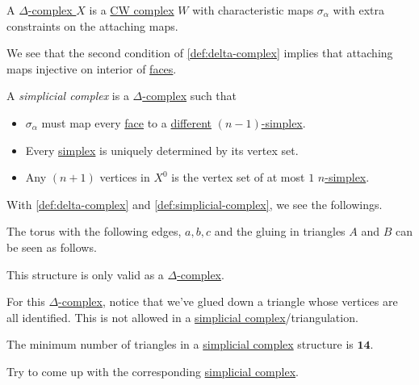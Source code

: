 \begin{exercise}
	A \hyperref[def:delta-complex]{\(\Delta\)-complex } \(X\) is a \hyperref[def:CW-Complex]{CW complex} \(W\) with characteristic maps \(\sigma _\alpha \)
	with extra constraints on the attaching maps.
\end{exercise}
\begin{note}
	We see that the second condition of \autoref{def:delta-complex} implies that attaching maps injective on interior of \hyperref[def:face]{faces}.
\end{note}

\begin{definition}\label{def:simplicial-complex}
	A \emph{simplicial complex} is a \hyperref[def:delta-complex]{\(\Delta \)-complex} such that
	\begin{itemize}
		\item \(\sigma _\alpha \) must map every \hyperref[def:face]{face} to a \underline{different} \hyperref[def:standard-simplex]{\((n-1)\)-simplex}.
		\item Every \hyperref[def:standard-simplex]{simplex} is uniquely determined by its vertex set.
		\item Any \((n+1)\) vertices in \(X^0\) is the vertex set of at most \(1\) \hyperref[def:standard-simplex]{\(n\)-simplex}.
	\end{itemize}
\end{definition}
\begin{eg}
	With \autoref{def:delta-complex} and \autoref{def:simplicial-complex}, we see the followings.
	\begin{figure}[H]
		\centering
		\label{fig:rmk:simplicial-complex}
	\end{figure}
\end{eg}

\begin{eg}
	The torus with the following edges, \(a, b, c\) and the gluing in triangles \(A\) and \(B\) can be seen as follows.
	\begin{figure}[H]
		\centering
		\label{fig:eg:constructing-torus-simplicial}
	\end{figure}
	This structure is only valid as a \hyperref[def:delta-complex]{\(\Delta\)-complex}.
\end{eg}
\begin{explanation}
	For this \hyperref[def:delta-complex]{\(\Delta \)-complex}, notice that we've glued down a triangle whose vertices are all
	identified. This is not allowed in a \hyperref[def:simplicial-complex]{simplicial complex}/triangulation.

	\begin{remark}
		The minimum number of triangles in a \hyperref[def:simplicial-complex]{simplicial complex} structure is \(\bm{14}\).
		\begin{exercise}
			Try to come up with the corresponding \hyperref[def:simplicial-complex]{simplicial complex}.
		\end{exercise}
	\end{remark}
\end{explanation}